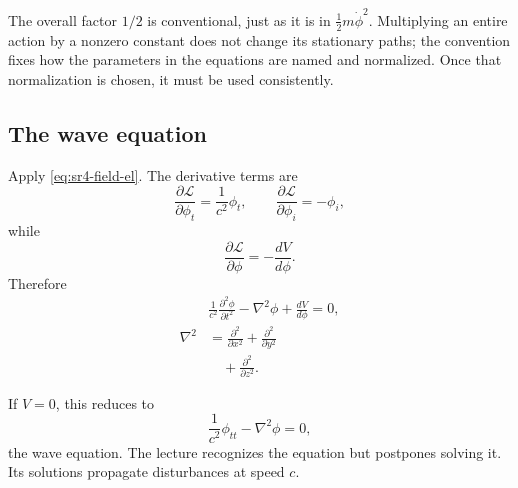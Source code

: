The overall factor \(1/2\) is conventional, just as it is in
\(\tfrac12m\dot\phi^2\).  Multiplying an entire action by a nonzero constant
does not change its stationary paths; the convention fixes how the parameters
in the equations are named and normalized.  Once that normalization is chosen,
it must be used consistently.

\begin{classroomqa}
\end{classroomqa}

\subsection{The wave equation}

Apply \eqref{eq:sr4-field-el}.  The derivative terms are
\begin{equation}
\frac{\partial\mathcal{L}}{\partial\phi_t}
=\frac{1}{c^2}\phi_t,
\qquad
\frac{\partial\mathcal{L}}{\partial\phi_i}
=-\phi_i,
\end{equation}
while
\begin{equation}
\frac{\partial\mathcal{L}}{\partial\phi}
=-\frac{dV}{d\phi}.
\end{equation}
Therefore
\begin{equation}
\begin{aligned}
&\boxed{
\frac{1}{c^2}\frac{\partial^2\phi}{\partial t^2}
-\nabla^2\phi
+\frac{dV}{d\phi}
=0
},\\[0.5em]
\nabla^2
&=
\frac{\partial^2}{\partial x^2}
+\frac{\partial^2}{\partial y^2}\\
&\quad
+\frac{\partial^2}{\partial z^2}.
\end{aligned}
\label{eq:sr4-general-scalar-eom}
\end{equation}

If \(V=0\), this reduces to
\begin{equation}
\boxed{
\frac{1}{c^2}\phi_{tt}-\nabla^2\phi=0
},
\label{eq:sr4-wave-equation}
\end{equation}
the wave equation.  The lecture recognizes the equation but postpones solving
it.  Its solutions propagate disturbances at speed \(c\).

